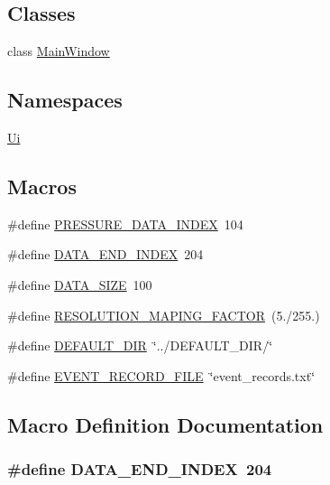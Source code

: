 \subsection*{Classes}
\begin{DoxyCompactItemize}
\item 
class \hyperlink{a00017}{Main\+Window}
\end{DoxyCompactItemize}
\subsection*{Namespaces}
\begin{DoxyCompactItemize}
\item 
 \hyperlink{a00145}{Ui}
\end{DoxyCompactItemize}
\subsection*{Macros}
\begin{DoxyCompactItemize}
\item 
\#define \hyperlink{a00110_a56c4aa163f5d0c550eeb89fdb3f08996}{P\+R\+E\+S\+S\+U\+R\+E\+\_\+\+D\+A\+T\+A\+\_\+\+I\+N\+D\+E\+X}~104
\item 
\#define \hyperlink{a00110_a61d054f24da5242788747ba3db5dfa11}{D\+A\+T\+A\+\_\+\+E\+N\+D\+\_\+\+I\+N\+D\+E\+X}~204
\item 
\#define \hyperlink{a00110_af55149bc1f05cf18af067a302e31e3f9}{D\+A\+T\+A\+\_\+\+S\+I\+Z\+E}~100
\item 
\#define \hyperlink{a00110_a58055d345f4a971dad22c043135fb214}{R\+E\+S\+O\+L\+U\+T\+I\+O\+N\+\_\+\+M\+A\+P\+I\+N\+G\+\_\+\+F\+A\+C\+T\+O\+R}~(5./255.)
\item 
\#define \hyperlink{a00110_a63ec0cea9c1f0ca8a7893c2c53d2fd81}{D\+E\+F\+A\+U\+L\+T\+\_\+\+D\+I\+R}~\char`\"{}../D\+E\+F\+A\+U\+L\+T\+\_\+\+D\+I\+R/\char`\"{}
\item 
\#define \hyperlink{a00110_a8d4ad2cd60e024f6e0f37dbac40768a1}{E\+V\+E\+N\+T\+\_\+\+R\+E\+C\+O\+R\+D\+\_\+\+F\+I\+L\+E}~\char`\"{}event\+\_\+records.\+txt\char`\"{}
\end{DoxyCompactItemize}


\subsection{Macro Definition Documentation}
\hypertarget{a00110_a61d054f24da5242788747ba3db5dfa11}{
\subsubsection[{D\+A\+T\+A\+\_\+\+E\+N\+D\+\_\+\+I\+N\+D\+E\+X}]{\setlength{\rightskip}{0pt plus 5cm}\#define D\+A\+T\+A\+\_\+\+E\+N\+D\+\_\+\+I\+N\+D\+E\+X~204}}\label{a00110_a61d054f24da5242788747ba3db5dfa11}


